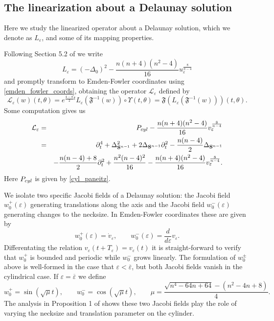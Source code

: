 \documentclass[reqno,11pt]{amsart}
\theoremstyle{tttheorem}
\newcommand{\Ss}{\mathbf{S}}
\begin{document}
\subsection{The linearization about a Delaunay solution}

Here we study the linearized operator about a Delaunay solution, which we 
denote as $L_\varepsilon$, and 
some of its mapping properties. 

Following Section 5.2 of \cite{del-ends} we write 
$$L_\varepsilon = (-\Delta_0)^2 - \frac{n(n+4)(n^2-4)}{16} 
u_\varepsilon^{\frac{8}{n-4}} $$
and promptly transform to Emden-Fowler coordinates using \eqref{emden_fowler_coords}, 
obtaining the operator $\mathcal{L}_\varepsilon$ defined by 
\begin{equation} \label{del_linearization1} 
\mathcal{L}_\varepsilon (w) (t,\theta) = e^{\frac{4-n}{2} t}
L_\varepsilon (\mathfrak{F}^{-1} (w)) \circ \Upsilon (t,\theta)= 
\mathfrak{F} (L_\varepsilon (\mathfrak{F}^{-1} (w))) (t,\theta). 
\end{equation} 
Some computation gives us 
\begin{eqnarray} \label{del_linearization2} 
\mathcal{L}_\varepsilon & = & P_{\rm cyl} - \frac{n(n+4)(n^2-4)}{16} 
v_\varepsilon^{\frac{8}{n-4}}\nonumber\\
& = & \partial_t^4 + \Delta_{\Ss^{n-1}}^2 + 
2\Delta_{\Ss^{n-1}} \partial_t^2 - \frac{n(n-4)}{2} \Delta_{\Ss^{n-1}} \\ \nonumber 
&&- \frac{n(n-4)+8}{2} \partial_t^2 + \frac{n^2(n-4)^2}{16} - \frac{n(n+4)(n^2-4)}{16} 
v_\varepsilon^{\frac{8}{n-4}}.
\end{eqnarray} 
Here $P_{\rm cyl}$ is given by \eqref{cyl_paneitz}. 

We isolate two specific Jacobi fields of a Delaunay solution: the Jacobi 
field $w_0^+(\varepsilon)$ generating translations along the axis and the Jacobi 
field $w_0^-(\varepsilon)$ generating changes to the necksize. In Emden-Fowler coordinates
these are given by 
\begin{equation} \label{geom_jac_fields}
w_0^+(\varepsilon) = \dot v_{\varepsilon} , \qquad w_0^-(\varepsilon) 
= \frac{d}{d\varepsilon}v_\varepsilon. \end{equation} 
Differentating the relation $v_\varepsilon (t+T_\varepsilon) = v_\varepsilon(t)$
it is straight-forward to verify that $w_0^+$ is bounded and periodic 
while $w_0^-$ grows linearly. The formulation of $w_0^\pm$ above 
is well-formed in the case that $\varepsilon < \overline{\varepsilon}$, but 
both Jacobi fields vanish in the cylindrical case. If $\varepsilon = 
\overline{\varepsilon}$ we define 
\begin{equation} \label{cyl_jac_fields}
w_0^+ = \sin(\sqrt{\mu} t), \qquad w_0^- = \cos(\sqrt{\mu} t), \qquad 
\mu = \frac{\sqrt{n^4-64n+64} - (n^2-4n+8)}{4}. \end{equation} 
The analysis in Proposition 1 of \cite{BR} shows these two 
Jacobi fields play the role of varying the necksize and translation 
parameter on the cylinder. 
\end{document}
